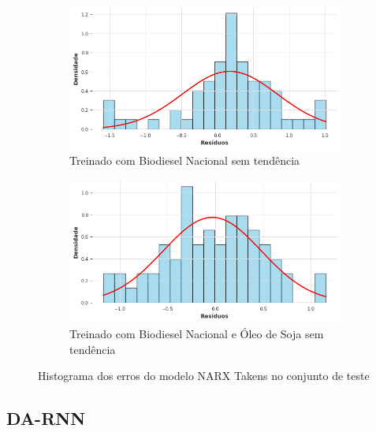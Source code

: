 \begin{figure}[htbp]
	\begin{subfigure}[b]{0.40\textwidth}
		\centering
		\includegraphics[width=\textwidth]{figuras/narx_takens_brasil_detrend_residuals_histogram.png} %
		\caption{Treinado com Biodiesel Nacional sem tendência}
		\label{fig:narx_takens_brasil_detrend_residuals_histogram}
	\end{subfigure}
	\hfill
	\begin{subfigure}[b]{0.40\textwidth}
		\centering
		\includegraphics[width=\textwidth]{figuras/narx_takens_brasil_oil_detrend_residuals_histogram.png} %
		\caption{Treinado com Biodiesel Nacional e Óleo de Soja sem tendência}
		\label{fig:narx_takens_brasil_oil_detrend_residuals_histogram}
	\end{subfigure}

	\caption{Histograma dos erros do modelo \acs{NARX} Takens no conjunto de teste}
	\label{fig:narx_takens_residuals_histogram}
\end{figure}

\subsection{\acs{DA-RNN}}
